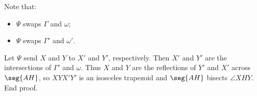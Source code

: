 Note that:
\begin{itemize}[itemsep=0em]
    \item $\Psi$ swaps $\Gamma$ and $\omega$;
    \item $\Psi$ swaps $\Gamma'$ and $\omega'$.
\end{itemize}
Let $\Psi$ send $X$ and $Y$ to $X'$ and $Y'$, respectively. Then $X'$ and $Y'$ are the intersections of $\Gamma'$ and $\omega$. Thus $X$ and $Y$ are the reflections of $Y'$ and $X'$ across $\seg{AH}$, so $XYX'Y'$ is an isosceles trapezoid and $\seg{AH}$ bisects $\angle XHY$. End proof.

